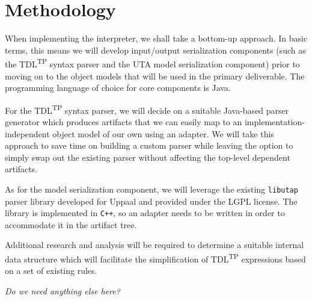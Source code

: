 \documentclass[12pt,oneside,a4paper,draft,notitlepage]{article}
\begin{document}
	\section*{Methodology}
	\par When implementing the interpreter, we shall take a bottom-up approach. In basic terms, this means we will develop input/output serialization components (such as the TDL\textsuperscript{TP} syntax parser and the UTA model serialization component) prior to moving on to the object models that will be used in the primary deliverable. The programming language of choice for core components is Java.

	\bigskip

	\par For the TDL\textsuperscript{TP} syntax parser, we will decide on a suitable Java-based parser generator which produces artifacts that we can easily map to an implementation-independent object model of our own using an adapter. We will take this approach to save time on building a custom parser while leaving the option to simply swap out the existing parser without affecting the top-level dependent artifacts.

	\bigskip

	\par As for the model serialization component, we will leverage the existing \texttt{libutap} parser library \cite{libutapsite} developed for Uppaal and provided under the LGPL license. The library is implemented in \texttt{C++}, so an adapter needs to be written in order to accommodate it in the artifact tree.

	\bigskip

	\par Additional research and analysis will be required to determine a suitable internal data structure which will facilitate the simplification of TDL\textsuperscript{TP} expressions based on a set of existing rules.

	\bigskip

	\par \textit{Do we need anything else here?}

	\printbibliography[
		title=Sources
	]
\end{document}
